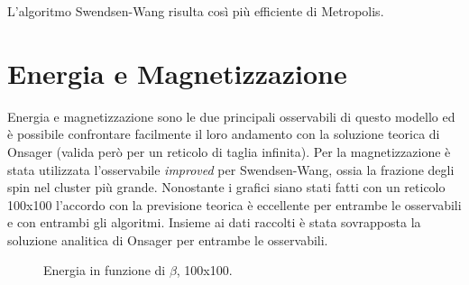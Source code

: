 L'algoritmo Swendsen-Wang risulta così più efficiente di Metropolis.
\newpage

\section{Energia e Magnetizzazione}
Energia e magnetizzazione sono le due principali osservabili di questo modello ed è possibile confrontare facilmente il loro andamento con la soluzione teorica di Onsager (valida però per un reticolo di taglia infinita).
Per la magnetizzazione è stata utilizzata l'osservabile \emph{improved} per Swendsen-Wang, ossia la frazione degli spin nel cluster più grande.
Nonostante i grafici siano stati fatti con un reticolo 100x100 l'accordo con la previsione teorica è eccellente per entrambe le osservabili e con entrambi gli algoritmi.
Insieme ai dati raccolti è stata sovrapposta la soluzione analitica di Onsager per entrambe le osservabili.
\begin{figure}[h]
\caption{Energia in funzione di $\beta$, 100x100.}
\end{figure}

